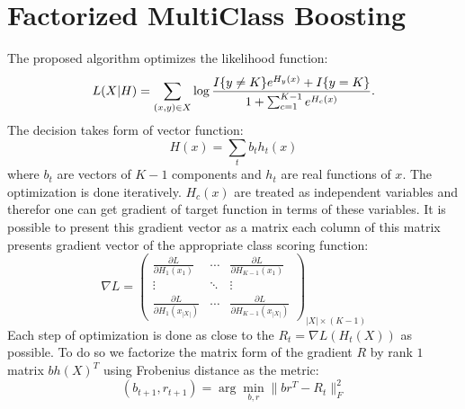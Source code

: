 \documentclass{article}
\begin{document}
\section{Factorized MultiClass Boosting}
The proposed algorithm optimizes the likelihood function:
\begin{multline*}
	L(X\arrowvert H) = \sum_{(x,y) \in X} \log \frac{ I\{y \ne K \}e^{H_y(x)} + I\{y=K\} }{ 1+\sum_{c=1}^{K-1} e^{H_c(x)} }.
\end{multline*}
The decision takes form of vector function:
\begin{equation}
H(x) = \sum_t b_{t} h_t(x) 
\end{equation}
where $b_t$ are vectors of $K-1$ components and $h_t$ are real functions of $x$. The optimization is done iteratively. $H_c(x)$ are treated as independent variables and therefor one can get gradient of target function in terms of these variables. It is possible to present this gradient vector as a matrix each column of this matrix presents gradient vector of the appropriate class scoring function:
\begin{equation}
\label{eq:grad_matrix}
\nabla L = 
\left(
\begin{array}{ccc}
	  \frac{ \partial L }{ \partial H_{1}(x_{1}) } 
	& \cdots 
	& \frac{ \partial L }{ \partial H_{K-1}(x_{1}) } \\

	  \vdots & \ddots & \vdots\\

	  \frac{ \partial L }{ \partial H_{1}(x_{|X|}) } 
	& \cdots 
	& \frac{ \partial L }{ \partial H_{K-1}(x_{|X|}) }
\end{array}
\right)_{|X| \times (K-1)}
\end{equation}
Each step of optimization is done as close to the $R_t = \nabla L(H_t(X))$ as possible. To do so we factorize the matrix form of the gradient $R$ by rank $1$ matrix $b h(X)^T$ using Frobenius distance as the metric:
\begin{equation}
(b_{t+1},r_{t+1}) = \arg \min_{b,r} \|b r^T - R_t\|_F^2
\label{eq:factorization_step}
\end{equation}
\end{document}
